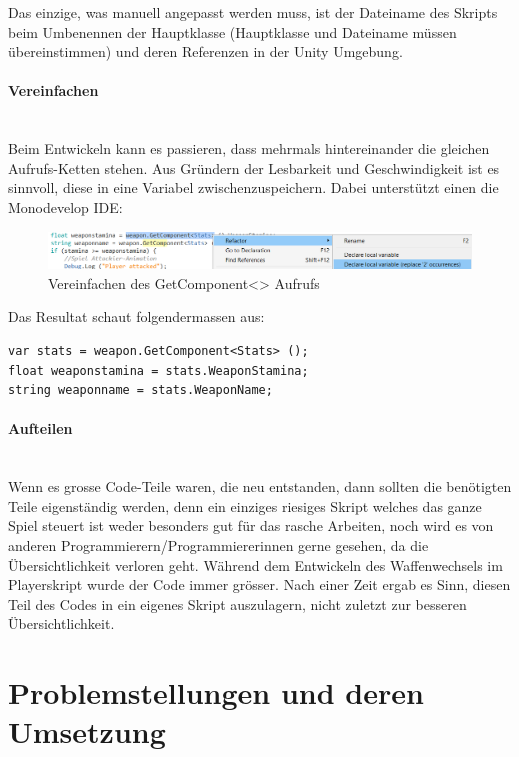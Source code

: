 Das einzige, was manuell angepasst werden muss, ist der Dateiname des Skripts beim Umbenennen der Hauptklasse (Hauptklasse und Dateiname müssen übereinstimmen) und deren Referenzen in der Unity Umgebung.

\paragraph{Vereinfachen}\mbox{} \\
Beim Entwickeln kann es passieren, dass mehrmals hintereinander die gleichen Aufrufs-Ketten stehen. Aus Gründern der Lesbarkeit und Geschwindigkeit ist es sinnvoll, diese in eine Variabel zwischenzuspeichern. Dabei unterstützt einen die Monodevelop IDE:

\begin{figure}[H]
\includegraphics[scale=0.67]{screenshots/refactor.png}
\caption{Vereinfachen des GetComponent<> Aufrufs}
\end{figure}

Das Resultat schaut folgendermassen aus:

\begin{lstlisting}[caption={Code nach Vereinfachung}]
var stats = weapon.GetComponent<Stats> ();
float weaponstamina = stats.WeaponStamina;
string weaponname = stats.WeaponName;
\end{lstlisting}

\paragraph{Aufteilen}\mbox{} \\
Wenn es grosse Code-Teile waren, die neu entstanden, dann sollten die benötigten Teile eigenständig werden, denn ein einziges riesiges Skript welches das ganze Spiel steuert ist weder besonders gut für das rasche Arbeiten, noch wird es von anderen Programmierern/Programmiererinnen gerne gesehen, da die Übersichtlichkeit verloren geht.
Während dem Entwickeln des Waffenwechsels im Playerskript wurde der Code immer grösser. Nach einer Zeit ergab es Sinn, diesen Teil des Codes in ein eigenes Skript auszulagern, nicht zuletzt zur besseren Übersichtlichkeit.

\section{Problemstellungen und deren Umsetzung}

